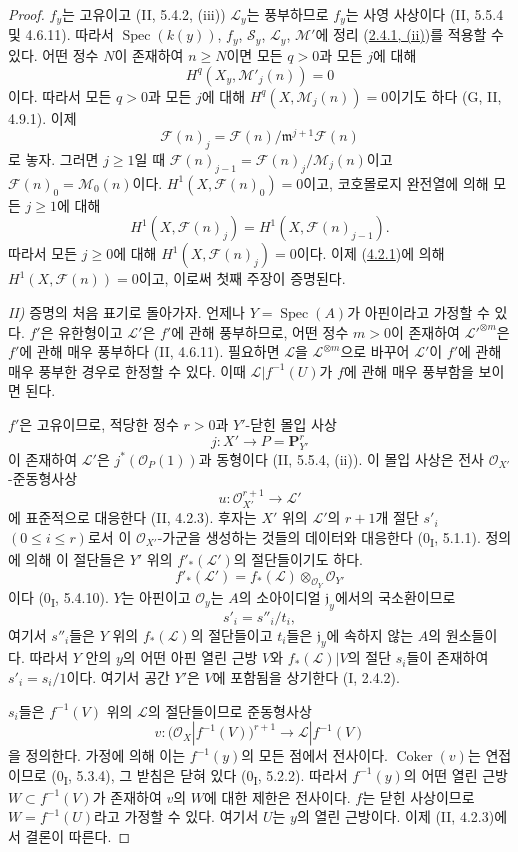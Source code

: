\begin{proof}
$f_y$는 고유이고 (II, 5.4.2, (iii)) $\mathcal L_y$는
풍부하므로 $f_y$는 사영 사상이다 (II, 5.5.4 및 4.6.11).
따라서 $\operatorname{Spec}(k(y))$, $f_y$, $\mathcal S_y$,
$\mathcal L_y$, $\mathcal M'$에 정리
(\hyperref[III.2.4.1-fr]{2.4.1, (ii)})를 적용할 수 있다.
어떤 정수 $N$이 존재하여 $n\geq N$이면 모든 $q>0$과 모든 $j$에
대해
\[
H^q(X_y,\mathcal M'_j(n))=0
\]
이다. 따라서 모든 $q>0$과 모든 $j$에 대해
$H^q(X,\mathcal M_j(n))=0$이기도 하다 (G, II, 4.9.1).
이제
\[
\mathcal F(n)_j
=\mathcal F(n)/\mathfrak m^{j+1}\mathcal F(n)
\]
로 놓자. 그러면 $j\geq1$일 때
$\mathcal F(n)_{j-1}=\mathcal F(n)_j/\mathcal M_j(n)$이고
$\mathcal F(n)_0=\mathcal M_0(n)$이다.
$H^1(X,\mathcal F(n)_0)=0$이고, 코호몰로지 완전열에 의해 모든
$j\geq1$에 대해
\[
H^1(X,\mathcal F(n)_j)=H^1(X,\mathcal F(n)_{j-1}).
\]
따라서 모든 $j\geq0$에 대해
$H^1(X,\mathcal F(n)_j)=0$이다. 이제
(\hyperref[III.4.2.1-fr]{4.2.1})에 의해
$H^1(X,\mathcal F(n))=0$이고, 이로써 첫째 주장이 증명된다.


\noindent\textit{II)}
증명의 처음 표기로 돌아가자. 언제나 $Y=\operatorname{Spec}(A)$가
아핀이라고 가정할 수 있다. $f'$은 유한형이고 $\mathcal L'$은
$f'$에 관해 풍부하므로, 어떤 정수 $m>0$이 존재하여
$\mathcal L'^{\otimes m}$은 $f'$에 관해 매우 풍부하다
(II, 4.6.11). 필요하면 $\mathcal L$을
$\mathcal L^{\otimes m}$으로 바꾸어 $\mathcal L'$이 $f'$에 관해
매우 풍부한 경우로 한정할 수 있다. 이때
$\mathcal L|f^{-1}(U)$가 $f$에 관해 매우 풍부함을 보이면 된다.

$f'$은 고유이므로, 적당한 정수 $r>0$과 $Y'$-닫힌 몰입 사상
\[
j:X'\longrightarrow P=\mathbf P_{Y'}^r
\]
이 존재하여 $\mathcal L'$은 $j^*(\mathcal O_P(1))$과 동형이다
(II, 5.5.4, (ii)). 이 몰입 사상은 전사
$\mathcal O_{X'}$-준동형사상
\[
u:\mathcal O_{X'}^{r+1}\longrightarrow\mathcal L'
\]
에 표준적으로 대응한다 (II, 4.2.3). 후자는 $X'$ 위의
$\mathcal L'$의 $r+1$개 절단 $s'_i$ $(0\leq i\leq r)$로서 이
$\mathcal O_{X'}$-가군을 생성하는 것들의 데이터와 대응한다
(0\textsubscript{I}, 5.1.1). 정의에 의해 이 절단들은 $Y'$ 위의
$f'_*(\mathcal L')$의 절단들이기도 하다.
\[
f'_*(\mathcal L')
=f_*(\mathcal L)\otimes_{\mathcal O_Y}\mathcal O_{Y'}
\]
이다 (0\textsubscript{I}, 5.4.10). $Y$는 아핀이고
$\mathcal O_y$는 $A$의 소아이디얼 $\mathfrak j_y$에서의
국소환이므로
\[
s'_i=s''_i/t_i,
\]
여기서 $s''_i$들은 $Y$ 위의 $f_*(\mathcal L)$의 절단들이고
$t_i$들은 $\mathfrak j_y$에 속하지 않는 $A$의 원소들이다.
따라서 $Y$ 안의 $y$의 어떤 아핀 열린 근방 $V$와
$f_*(\mathcal L)|V$의 절단 $s_i$들이 존재하여 $s'_i=s_i/1$이다.
여기서 공간 $Y'$은 $V$에 포함됨을 상기한다 (I, 2.4.2).

$s_i$들은 $f^{-1}(V)$ 위의 $\mathcal L$의 절단들이므로
준동형사상
\[
v:\bigl(\mathcal O_X|f^{-1}(V)\bigr)^{r+1}
\longrightarrow\mathcal L|f^{-1}(V)
\]
을 정의한다. 가정에 의해 이는 $f^{-1}(y)$의 모든 점에서 전사이다.
$\operatorname{Coker}(v)$는 연접이므로
(0\textsubscript{I}, 5.3.4), 그 받침은 닫혀 있다
(0\textsubscript{I}, 5.2.2). 따라서 $f^{-1}(y)$의 어떤 열린 근방
$W\subset f^{-1}(V)$가 존재하여 $v$의 $W$에 대한 제한은 전사이다.
$f$는 닫힌 사상이므로 $W=f^{-1}(U)$라고 가정할 수 있다. 여기서
$U$는 $y$의 열린 근방이다. 이제 (II, 4.2.3)에서 결론이 따른다.
\end{proof}

